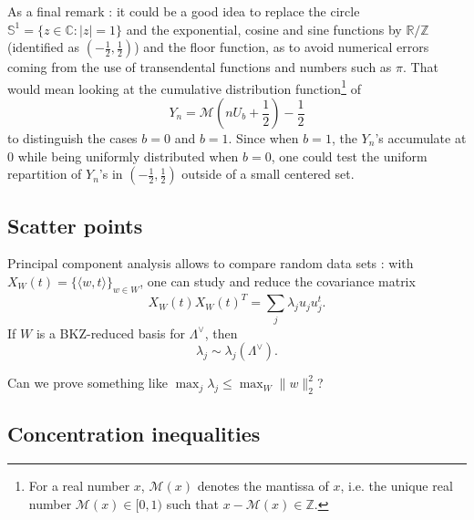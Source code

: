 \begin{center}
\end{center}

As a final remark : it could be a good idea to replace the circle $\mathbb S^1 = \{z\in \mathbb C : |z|=1\}$ and the exponential, cosine and sine functions by $\mathbb R / \mathbb Z$ (identified as $(-\frac{1}{2} , \frac{1}{2})$) and the floor function, as to avoid numerical errors coming from the use of transendental functions and numbers such as $\pi$. That would mean looking at the cumulative distribution function\footnote{For a real number $x$, $\mathcal M(x)$ denotes the mantissa of $x$, i.e. the unique real number $\mathcal M(x)\in [0,1)$ such that $x-\mathcal M(x)\in \mathbb Z$.} of 
$$Y_n = \mathcal M ( n U_b +\frac{1}{2} ) -\frac{1}{2} $$
to distinguish the cases $b=0$ and $b=1$. Since when $b=1$, the $Y_n$'s accumulate at 0 while being uniformly distributed when $b=0$, one could test the uniform repartition of $Y_n$'s in  $(-\frac{1}{2} , \frac{1}{2})$ outside of a small centered set.


\subsection{Scatter points}

Principal component analysis allows to compare random data sets : with $X_W(t) = \{ \langle w , t \rangle \}_{w\in W}$, one can study and reduce the covariance matrix
$$X_W(t) X_W(t)^T =\sum_j \lambda_j u_ju_j^t.$$
If $W$ is a BKZ-reduced basis for $\Lambda^\vee$, then 
$$ \lambda_j \sim \lambda_j(\Lambda^\vee).$$

Can we prove something like $\max_j \lambda_j \leq \max_W \|w\|_2^2$?

\subsection{Concentration inequalities} %

